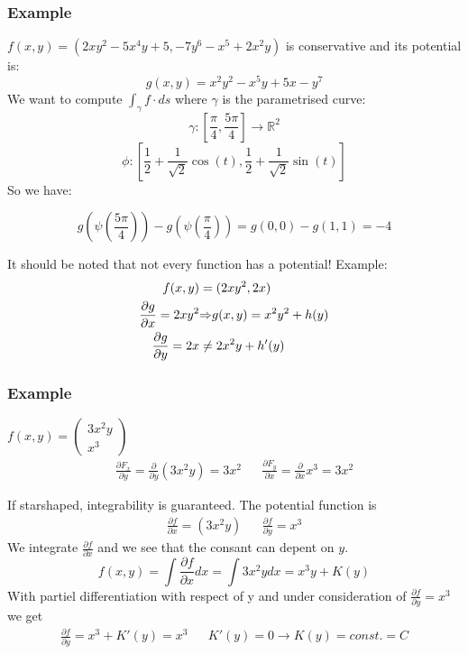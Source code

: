 \documentclass[8pt]{extarticle}
\newcommand{\Ra}{{\Rightarrow}}
\begin{document}
\begin{multicols*}{3}
\begin{tcolorbox}[colback=blue!5!white,colframe=blue!75!black]
\subsubsection{Example}
$f(x,y) = (2xy^2 - 5x^4y + 5, -7y^6 - x^5 + 2x^2y)$ is conservative and its potential is:
$$g(x,y) = x^2y^2 - x^5y + 5x - y^7$$
We want to compute $\int_\gamma f \cdot ds$ where $\gamma$ is the parametrised curve:
$$ \gamma : \left[\frac{\pi}{4}, \frac{5\pi}{4}\right] \to \mathbb{R}^2$$
$$ \phi : \left[\frac{1}{2} + \frac{1}{\sqrt{2}} \cos(t), \frac{1}{2} + \frac{1}{\sqrt{2}} \sin(t)\right]$$
So we have:

	 $$g\left(\psi\left(\frac{5\pi}{4}\right)\right) - g\left(\psi\left(\frac{\pi}{4}\right)\right) =  g(0, 0) - g(1, 1) = -4$$

\end{tcolorbox}
  It should be noted that not every function has a potential! Example:
  \begin{align*}
    f(x, y)            & = (2xy^2, 2x)               \\
    \pdv{g}{x} = 2xy^2 & \Ra g(x, y) = x^2y^2 + h(y) \\
    \pdv{g}{y} = 2x    & \neq 2x^2y + h'(y)
  \end{align*}
\begin{tcolorbox}[colback=blue!5!white,colframe=blue!75!black]
\subsubsection{Example}
$f(x,y) = 
\begin{pmatrix} 
3x^2 y \\
x^3 
\end{pmatrix}$
\begin{align*}
  \frac{\partial F_x}{\partial y} =\frac{\partial }{\partial y} (3x^2y) = 3x^2 &&  \frac{\partial F_y}{\partial x} =\frac{\partial }{\partial x} x^3 = 3x^2
\end{align*}

If starshaped, integrability is guaranteed. The potential function is
\begin{align*}
\frac{\partial f}{\partial x}  = (3x^2y) && \frac{\partial f}{\partial y} =  x^3
\end{align*}
We integrate $\frac{\partial f}{\partial x}$ and we see that the consant can depent on $y$.
$$f(x, y) = \int\frac{\partial f}{\partial x} dx = \int 3x^2y dx = x^3y + K(y)$$
With partiel differentiation with respect of y and under consideration of $\frac{\partial f}{\partial y} = x^3$ we get
\begin{align*}
	\frac{\partial f}{\partial y} =  x^3 + K'(y) = x^3 && K'(y) = 0 \rightarrow K(y) = const. = C
\end{align*}
\end{tcolorbox}

\end{multicols*}
\end{document}
